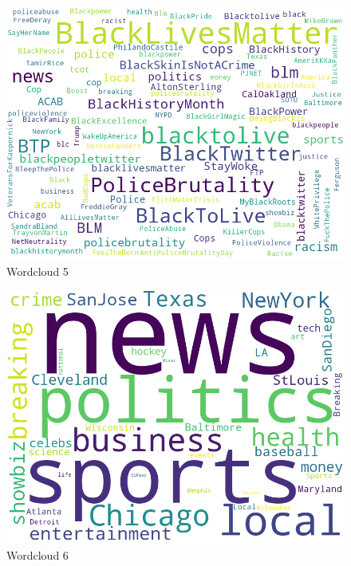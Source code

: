 \documentclass[12pt, authoryear]{elsarticle}
\begin{document}
\begin{figure}[H]
\includegraphics[width=5in]{wordcloud5}
\centering
\caption{Wordcloud 5}
\label{wordcloud:5}
\end{figure}

\begin{figure}[H]
\includegraphics[width=5in]{wordcloud6}
\centering
\caption{Wordcloud 6}
\label{wordcloud:6}
\end{figure}
\end{document}
